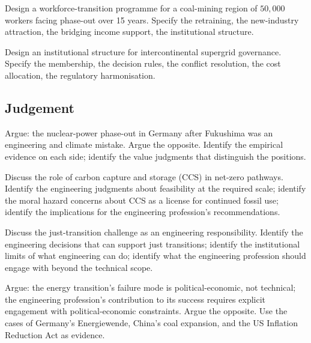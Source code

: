 \begin{exercise}
Design a workforce-transition programme for a coal-mining region of $50{,}000$ workers facing phase-out over 15 years. Specify the retraining, the new-industry attraction, the bridging income support, the institutional structure.
\end{exercise}

\begin{exercise}
Design an institutional structure for intercontinental supergrid governance. Specify the membership, the decision rules, the conflict resolution, the cost allocation, the regulatory harmonisation.
\end{exercise}

\subsection*{Judgement}

\begin{exercise}
Argue: the nuclear-power phase-out in Germany after Fukushima was an engineering and climate mistake. Argue the opposite. Identify the empirical evidence on each side; identify the value judgments that distinguish the positions.
\end{exercise}

\begin{exercise}
Discuss the role of carbon capture and storage (CCS) in net-zero pathways. Identify the engineering judgments about feasibility at the required scale; identify the moral hazard concerns about CCS as a license for continued fossil use; identify the implications for the engineering profession's recommendations.
\end{exercise}

\begin{exercise}
Discuss the just-transition challenge as an engineering responsibility. Identify the engineering decisions that can support just transitions; identify the institutional limits of what engineering can do; identify what the engineering profession should engage with beyond the technical scope.
\end{exercise}

\begin{exercise}
Argue: the energy transition's failure mode is political-economic, not technical; the engineering profession's contribution to its success requires explicit engagement with political-economic constraints. Argue the opposite. Use the cases of Germany's Energiewende, China's coal expansion, and the US Inflation Reduction Act as evidence.
\end{exercise}

